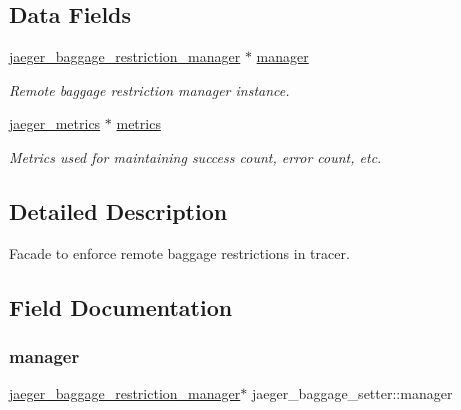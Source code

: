 \subsection*{Data Fields}
\begin{DoxyCompactItemize}
\item 
\mbox{\hyperlink{structjaeger__baggage__restriction__manager}{jaeger\+\_\+baggage\+\_\+restriction\+\_\+manager}} $\ast$ \mbox{\hyperlink{structjaeger__baggage__setter_ae0278c0f8980fa770fadcbe9fa82d507}{manager}}
\begin{DoxyCompactList}\small\item\em Remote baggage restriction manager instance. \end{DoxyCompactList}\item 
\mbox{\hyperlink{structjaeger__metrics}{jaeger\+\_\+metrics}} $\ast$ \mbox{\hyperlink{structjaeger__baggage__setter_a0ed0b61f9d103eda5775cbcfc200c802}{metrics}}
\begin{DoxyCompactList}\small\item\em Metrics used for maintaining success count, error count, etc. \end{DoxyCompactList}\end{DoxyCompactItemize}


\subsection{Detailed Description}
Facade to enforce remote baggage restrictions in tracer. 



\subsection{Field Documentation}
\mbox{\label{structjaeger__baggage__setter_ae0278c0f8980fa770fadcbe9fa82d507}} 
\subsubsection{\texorpdfstring{manager}{manager}}
{\footnotesize\ttfamily \mbox{\hyperlink{structjaeger__baggage__restriction__manager}{jaeger\+\_\+baggage\+\_\+restriction\+\_\+manager}}$\ast$ jaeger\+\_\+baggage\+\_\+setter\+::manager}



